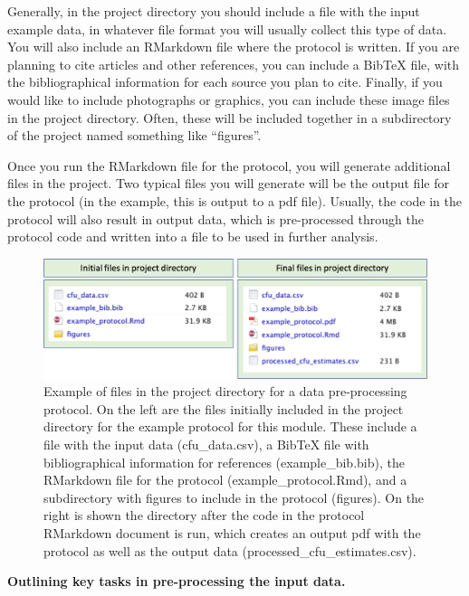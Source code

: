 \documentclass[]{tufte-book}
\begin{document}
Generally, in the project directory you should include a file with the input
example data, in whatever file format you will usually collect this type of
data. You will also include an RMarkdown file where the protocol is written. If
you are planning to cite articles and other references, you can include a BibTeX
file, with the bibliographical information for each source you plan to cite.
Finally, if you would like to include photographs or graphics, you can include
these image files in the project directory. Often, these will be included
together in a subdirectory of the project named something like ``figures''.

Once you run the RMarkdown file for the protocol, you will generate additional
files in the project. Two typical files you will generate will be the output
file for the protocol (in the example, this is output to a pdf file). Usually,
the code in the protocol will also result in output data, which is pre-processed
through the protocol code and written into a file to be used in further
analysis.

\begin{figure}
\includegraphics[width=\textwidth]{figures/protocol_project_files} \caption[Example of files in the project directory for a data pre-processing protocol]{Example of files in the project directory for a data pre-processing protocol. On the left are the files initially included in the project directory for the example protocol for this module. These include a file with the input data (cfu\_data.csv), a BibTeX file with bibliographical information for references (example\_bib.bib), the RMarkdown file for the protocol (example\_protocol.Rmd), and a subdirectory with figures to include in the protocol (figures). On the right is shown the directory after the code in the protocol RMarkdown document is run, which creates an output pdf with the protocol as well as the output data (processed\_cfu\_estimates.csv).}\label{fig:protocolprojectfiles}
\end{figure}

\textbf{Outlining key tasks in pre-processing the input data.}
\end{document}
